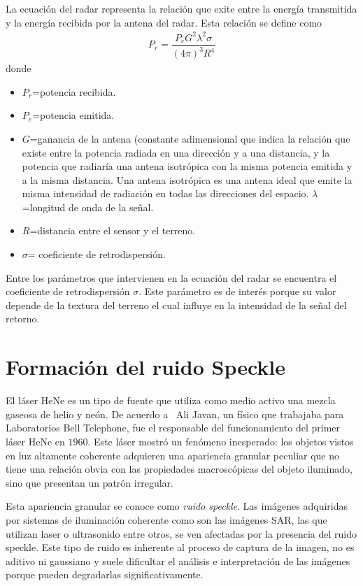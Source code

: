 La ecuación del radar representa la relación que exite entre la energía transmitida y la energía recibida por la antena del radar. Esta relación se define como
\begin{align}
P_r=\dfrac{P_e G^2 \lambda^2 \sigma}{(4 \pi)^3 R^4} 
\end{align}
donde
\begin{itemize}
	\item $P_r$=potencia recibida.
	\item $P_e$=potencia emitida.
	\item $G$=ganancia de la antena (constante adimensional que indica la relación que existe entre la potencia radiada en una dirección y a una distancia, y la  potencia que radiaría una antena isotrópica con la misma potencia emitida y a la misma distancia. Una antena isotrópica es una antena ideal que emite la misma intensidad de radiación en todas las direcciones del espacio.
	$\lambda$=longitud de onda de la señal.
	\item $R$=distancia entre el sensor y el terreno.
	\item $\sigma$= coeficiente de retrodispersión.
\end{itemize}

Entre los parámetros que intervienen en la ecuación del radar se encuentra el coeficiente de retrodispersión $\sigma$. Este parámetro es de interés porque su valor depende de la textura del terreno el cual influye en la intensidad de la señal del retorno.

\section{Formación del ruido Speckle}
\label{FormacionSpeckle}

El láser HeNe es un tipo de fuente que utiliza como medio activo una mezcla gaseosa de helio y neón. De acuerdo a~\cite{Goodman1975,Quel1994} Ali Javan, un físico que trabajaba para Laboratorios Bell Telephone, fue el responsable del funcionamiento del primer láser HeNe en $1960$. Este láser  mostró un fenómeno inesperado: los objetos vistos en luz altamente coherente adquieren una apariencia granular peculiar que no tiene una relación obvia con las propiedades macroscópicas del objeto iluminado, sino que presentan un patrón irregular. 

Esta apariencia granular se conoce como \textit{ruido speckle}. Las imágenes adquiridas por sistemas de iluminación coherente como son las imágenes SAR, las que utilizan laser o ultrasonido entre otros, se ven afectadas por la presencia del ruido speckle. Este tipo de ruido es inherente al proceso de captura de la imagen, no es aditivo ni gaussiano y suele dificultar el análisis e interpretación de las imágenes porque pueden degradarlas significativamente.



